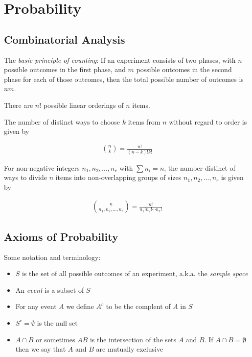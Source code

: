 \documentclass[10pt]{article}
\begin{document}
		
		\section{Probability}
		
		\subsection{Combinatorial Analysis}
		
		The \emph{basic principle of counting}: If an experiment consists of two phases, with $n$ possible outcomes in the first phase, and $m$ possible outcomes in the second phase for each of those outcomes, then the total possible number of outcomes is $nm$.
		
		There are $n!$ possible linear orderings of $n$ items.
		
		The number of distinct ways to choose $k$ items from $n$ without regard to order is given by
		
		\begin{align*}
			{n \choose k} = \frac{n!}{(n-k)!k!}
		\end{align*}
		
		For non-negative integers $n_1,n_2,\ldots, n_r$ with $\sum n_i = n$, the number distinct of ways to divide $n$ items into non-overlapping groups of sizes $n_1, n_2,\ldots, n_r$ is given by
		
		\begin{align*}
			{n \choose {n_1, n_2,\ldots, n_r}} = \frac{n!}{n_1!n_2! \cdots n_r!}
		\end{align*}
		
		\subsection{Axioms of Probability}
		
		Some notation and terminology:
		
		\begin{itemize}
			\item $S$ is the set of all possible outcomes of an experiment, a.k.a. the \emph{sample space}
			\item An \emph{event} is a subset of $S$
			\item For any event $A$ we define $A^c$ to be the complent of $A$ in $S$
			\item $S^c=\emptyset$ is the null set
			\item $A\cap B$ or sometimes $AB$ is the intersection of the sets $A$ and $B$. If $A\cap B = \emptyset$ then we say that $A$ and $B$ are mutually exclusive
		\end{itemize}
		
\end{document}
